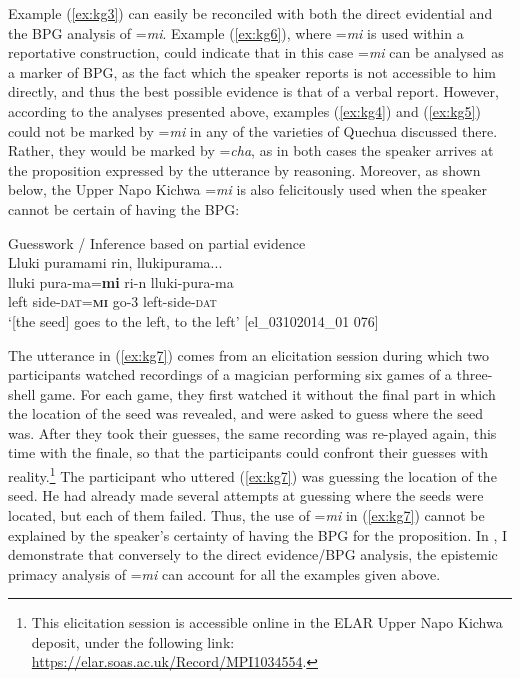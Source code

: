 \documentclass[output=paper]{langscibook}
\begin{document}
Example (\ref{ex:kg3}) can easily be reconciled with both the direct evidential and the BPG analysis of =\textit{mi}. Example (\ref{ex:kg6}), where =\textit{mi} is used within a reportative construction, could indicate that in this case =\textit{mi} can be analysed as a marker of BPG, as the fact which the speaker reports is not accessible to him directly, and thus the best possible evidence is that of a verbal report. However, according to the analyses presented above, examples (\ref{ex:kg4}) and (\ref{ex:kg5}) could not be marked by =\textit{mi} in any of the varieties of Quechua discussed there. Rather, they would be marked by =\textit{cha}, as in both cases the speaker arrives at the proposition expressed by the utterance by reasoning. Moreover, as shown below, the Upper Napo Kichwa =\textit{mi} is also felicitously used when the speaker cannot be certain of having the BPG:

\begin{exe}
	\ex Guesswork / Inference based on partial evidence\label{ex:kg7}\\
	\glll Lluki puramami rin, llukipurama...\\
	lluki pura-ma=\textbf{mi} ri-n lluki-pura-ma\\
	left side-\textsc{dat}=\textbf{\textsc{mi}} go-3 left-side-\textsc{dat}\\
	\trans ‘[the seed] goes to the left, to the left’ [el\_03102014\_01   076]
\end{exe}

The utterance in (\ref{ex:kg7}) comes from an elicitation session during which two participants watched recordings of a magician performing six games of a three-shell game. For each game, they first watched it without the final part in which the location of the seed was revealed, and were asked to guess where the seed was. After they took their guesses, the same recording was re-played again, this time with the finale, so that the participants could confront their guesses with reality.\footnote{This elicitation session is accessible online in the ELAR Upper Napo Kichwa deposit, under the following link: \url{https://elar.soas.ac.uk/Record/MPI1034554}.}  The participant who uttered (\ref{ex:kg7}) was guessing the location of the seed. He had already made several attempts at guessing where the seeds were located, but each of them failed. Thus, the use of =\textit{mi} in (\ref{ex:kg7}) cannot be explained by the speaker’s certainty of having the BPG for the proposition.
In , I demonstrate that conversely to the direct evidence/BPG analysis, the epistemic primacy analysis of =\textit{mi} can account for all the examples given above.
\end{document}
